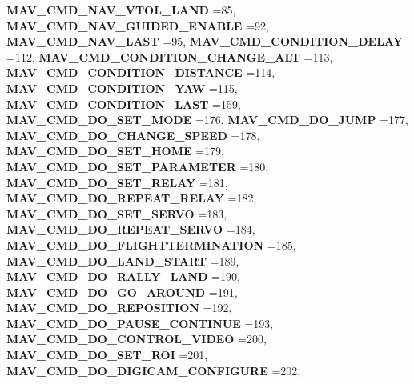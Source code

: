 \begin{DoxyCompactItemize}
\textbf{ M\+A\+V\+\_\+\+C\+M\+D\+\_\+\+N\+A\+V\+\_\+\+V\+T\+O\+L\+\_\+\+L\+A\+ND} =85, 
\textbf{ M\+A\+V\+\_\+\+C\+M\+D\+\_\+\+N\+A\+V\+\_\+\+G\+U\+I\+D\+E\+D\+\_\+\+E\+N\+A\+B\+LE} =92, 
\newline
\textbf{ M\+A\+V\+\_\+\+C\+M\+D\+\_\+\+N\+A\+V\+\_\+\+L\+A\+ST} =95, 
\textbf{ M\+A\+V\+\_\+\+C\+M\+D\+\_\+\+C\+O\+N\+D\+I\+T\+I\+O\+N\+\_\+\+D\+E\+L\+AY} =112, 
\textbf{ M\+A\+V\+\_\+\+C\+M\+D\+\_\+\+C\+O\+N\+D\+I\+T\+I\+O\+N\+\_\+\+C\+H\+A\+N\+G\+E\+\_\+\+A\+LT} =113, 
\textbf{ M\+A\+V\+\_\+\+C\+M\+D\+\_\+\+C\+O\+N\+D\+I\+T\+I\+O\+N\+\_\+\+D\+I\+S\+T\+A\+N\+CE} =114, 
\newline
\textbf{ M\+A\+V\+\_\+\+C\+M\+D\+\_\+\+C\+O\+N\+D\+I\+T\+I\+O\+N\+\_\+\+Y\+AW} =115, 
\textbf{ M\+A\+V\+\_\+\+C\+M\+D\+\_\+\+C\+O\+N\+D\+I\+T\+I\+O\+N\+\_\+\+L\+A\+ST} =159, 
\textbf{ M\+A\+V\+\_\+\+C\+M\+D\+\_\+\+D\+O\+\_\+\+S\+E\+T\+\_\+\+M\+O\+DE} =176, 
\textbf{ M\+A\+V\+\_\+\+C\+M\+D\+\_\+\+D\+O\+\_\+\+J\+U\+MP} =177, 
\newline
\textbf{ M\+A\+V\+\_\+\+C\+M\+D\+\_\+\+D\+O\+\_\+\+C\+H\+A\+N\+G\+E\+\_\+\+S\+P\+E\+ED} =178, 
\textbf{ M\+A\+V\+\_\+\+C\+M\+D\+\_\+\+D\+O\+\_\+\+S\+E\+T\+\_\+\+H\+O\+ME} =179, 
\textbf{ M\+A\+V\+\_\+\+C\+M\+D\+\_\+\+D\+O\+\_\+\+S\+E\+T\+\_\+\+P\+A\+R\+A\+M\+E\+T\+ER} =180, 
\textbf{ M\+A\+V\+\_\+\+C\+M\+D\+\_\+\+D\+O\+\_\+\+S\+E\+T\+\_\+\+R\+E\+L\+AY} =181, 
\newline
\textbf{ M\+A\+V\+\_\+\+C\+M\+D\+\_\+\+D\+O\+\_\+\+R\+E\+P\+E\+A\+T\+\_\+\+R\+E\+L\+AY} =182, 
\textbf{ M\+A\+V\+\_\+\+C\+M\+D\+\_\+\+D\+O\+\_\+\+S\+E\+T\+\_\+\+S\+E\+R\+VO} =183, 
\textbf{ M\+A\+V\+\_\+\+C\+M\+D\+\_\+\+D\+O\+\_\+\+R\+E\+P\+E\+A\+T\+\_\+\+S\+E\+R\+VO} =184, 
\textbf{ M\+A\+V\+\_\+\+C\+M\+D\+\_\+\+D\+O\+\_\+\+F\+L\+I\+G\+H\+T\+T\+E\+R\+M\+I\+N\+A\+T\+I\+ON} =185, 
\newline
\textbf{ M\+A\+V\+\_\+\+C\+M\+D\+\_\+\+D\+O\+\_\+\+L\+A\+N\+D\+\_\+\+S\+T\+A\+RT} =189, 
\textbf{ M\+A\+V\+\_\+\+C\+M\+D\+\_\+\+D\+O\+\_\+\+R\+A\+L\+L\+Y\+\_\+\+L\+A\+ND} =190, 
\textbf{ M\+A\+V\+\_\+\+C\+M\+D\+\_\+\+D\+O\+\_\+\+G\+O\+\_\+\+A\+R\+O\+U\+ND} =191, 
\textbf{ M\+A\+V\+\_\+\+C\+M\+D\+\_\+\+D\+O\+\_\+\+R\+E\+P\+O\+S\+I\+T\+I\+ON} =192, 
\newline
\textbf{ M\+A\+V\+\_\+\+C\+M\+D\+\_\+\+D\+O\+\_\+\+P\+A\+U\+S\+E\+\_\+\+C\+O\+N\+T\+I\+N\+UE} =193, 
\textbf{ M\+A\+V\+\_\+\+C\+M\+D\+\_\+\+D\+O\+\_\+\+C\+O\+N\+T\+R\+O\+L\+\_\+\+V\+I\+D\+EO} =200, 
\textbf{ M\+A\+V\+\_\+\+C\+M\+D\+\_\+\+D\+O\+\_\+\+S\+E\+T\+\_\+\+R\+OI} =201, 
\textbf{ M\+A\+V\+\_\+\+C\+M\+D\+\_\+\+D\+O\+\_\+\+D\+I\+G\+I\+C\+A\+M\+\_\+\+C\+O\+N\+F\+I\+G\+U\+RE} =202, 

\end{DoxyCompactItemize}
